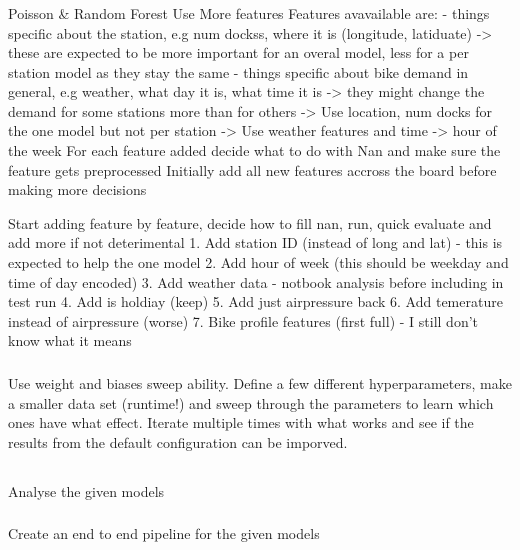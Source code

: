 \documentclass[a4paper]{article}
\begin{document}
    \subsubsection*{}
    Poisson \& Random Forest Use More features
    Features avavailable are:
    - things specific about the station, e.g num dockss, where it is (longitude, latiduate) -> these are expected to be more important
    for an overal model, less for a per station model as they stay the same
    - things specific about bike demand in general, e.g weather, what day it is, what time it is -> they might change the demand
    for some stations more than for others
    -> Use location, num docks for the one model but not per station
    -> Use weather features and time  -> hour of the week
    For each feature added decide what to do with Nan and make sure the feature gets preprocessed
    Initially add all new features accross the board before making more decisions

    Start adding feature by feature, decide how to fill nan, run, quick evaluate and add more if not deterimental
    1. Add station ID (instead of long and lat) - this is expected to help the one model
    2. Add hour of week (this should be weekday and time of day encoded)
    3. Add weather data - notbook analysis before including in test run
    4. Add is holdiay (keep)
    5. Add just airpressure back
    6. Add temerature instead of airpressure (worse)
    7. Bike profile features (first full) - I still don't know what it means

    \subsubsection*{}
    Use weight and biases sweep ability. Define a few different hyperparameters, make a smaller data set (runtime!) and
    sweep through the parameters to learn which ones have what effect. Iterate multiple times with what works and
    see if the results from the default configuration can be imporved.

    \subsection*{}
    \subsubsection*{} Analyse the given models
    \subsubsection*{} Create an end to end pipeline for the given models
\end{document}
